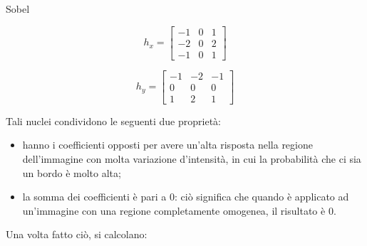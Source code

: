 \begin{center}
\begin{minipage}{0.11\textwidth} %
    \centering
    Sobel
\end{minipage}
\hfill
\begin{minipage}{0.31\textwidth} %
    \centering
    \begin{equation*}
    h_x=\begin{bmatrix}
        -1 & 0 & 1\\
        -2 & 0 & 2\\
        -1 & 0 & 1
    \end{bmatrix}
\end{equation*}
\end{minipage}
\hfill %
\begin{minipage}{0.31\textwidth} %
    \centering
    \begin{equation*}
    h_y=\begin{bmatrix}
        -1 & -2 & -1\\
        0 & 0 & 0\\
        1 & 2 & 1
    \end{bmatrix}
\end{equation*}
\end{minipage}
\end{center}
Tali nuclei condividono le seguenti due proprietà:
\begin{itemize}
    \item hanno i coefficienti opposti per avere un'alta risposta nella regione dell'immagine con molta variazione d'intensità, in cui la probabilità che ci sia un bordo è molto alta;
    \item la somma dei coefficienti è pari a $0$: ciò significa che quando è applicato ad un'immagine con una regione completamente omogenea, il risultato è $0$.
\end{itemize}
Una volta fatto ciò, si calcolano:
